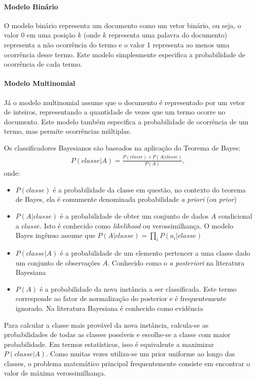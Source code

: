 \paragraph{Modelo Binário}
O modelo binário representa um documento como um vetor binário, ou seja, o valor 0 em uma posição \(k\) (onde \(k\) representa uma palavra do documento) representa a não ocorrência do termo e o valor 1 representa ao menos uma ocorrência desse termo. Este modelo simplesmente especifica a probabilidade de ocorrência de cada termo.

\paragraph{Modelo Multinomial}
Já o modelo multinomial assume que o documento é representado por um vetor de inteiros, representando a quantidade de vezes que um termo ocorre no documento. Este modelo também especifica a probabilidade de ocorrência de um termo, mas permite ocorrências múltiplas.

Os classificadores Bayesianos são baseados na aplicação do Teorema de Bayes:
%
\begin{align}
P(classe|A) = \frac{P(classe) \times P(A|classe)}{P(A)},
\end{align}
%
onde:

\begin{itemize}
    \item \(P(classe)\) é a probabilidade da classe em questão, no contexto do teorema de Bayes, ela é comumente denominada probabilidade \textit{a priori} (ou \textit{prior})
    \item \(P(A|classe)\) é a probabilidade de obter um conjunto de dados \(A\) condicional a \(classe\). Isto é conhecido como \textit{likelihood} ou verossimilhança. O modelo Bayes ingênuo assume que \(P(A|classe) = \prod_{i} P(a_{i}|classe)\)
    \item \(P(classe|A)\) é a probabilidade de um elemento pertencer a uma classe dado um conjunto de observações \(A\). Conhecido como o \textit{a posteriori} na literatura Bayesiana
    \item \(P(A)\) é a probabilidade da nova instância a ser classificada. Este termo corresponde ao fator de normalização do posterior e é frequentemente ignorado. Na literatura Bayesiana é conhecido como evidência \cite{jaynes2003}
\end{itemize}

Para calcular a classe mais provável da nova instância, calcula-se as probabilidades de todas as classes possíveis e escolhe-se a classe com maior probabilidade. Em termos estatísticos, isso é equivalente a maximizar \(P(classe|A)\). Como muitas vezes utiliza-se um prior uniforme ao longo das classes, o problema matemático principal frequentemente consiste em encontrar o valor de máxima verossimilhança.

